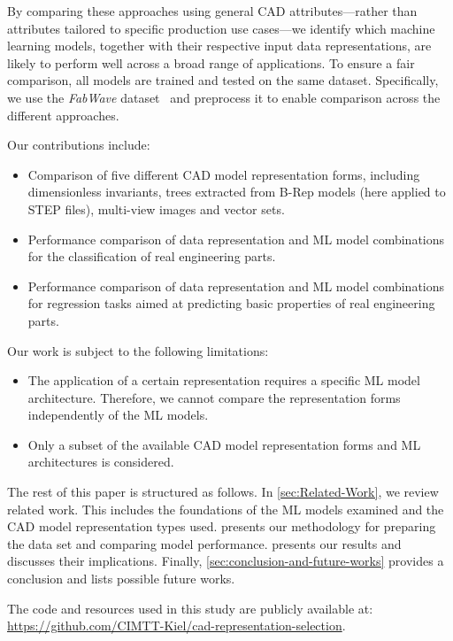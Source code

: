 \documentclass[5p,times,procedia]{elsarticle}
\begin{document}
By comparing these approaches using general CAD attributes—rather than attributes tailored to specific production use cases—we identify which machine learning models, together with their respective input data representations, are likely to perform well across a broad range of applications.
To ensure a fair comparison, all models are trained and tested on the same dataset.
Specifically, we use the \textit{FabWave} dataset~\cite{starly2019fabwave} and preprocess it to enable comparison across the different approaches.

Our contributions include: 
\begin{itemize}
    \item Comparison of five different CAD model representation forms, including dimensionless invariants, trees extracted from \mbox{B-Rep} models (here applied to STEP files), multi-view images and vector sets.
    \item Performance comparison of data representation and ML model combinations for the classification of real engineering parts.
    \item Performance comparison of data representation and ML model combinations for regression tasks aimed at predicting basic properties of real engineering parts.
\end{itemize}

Our work is subject to the following limitations:
\begin{itemize}
    \item The application of a certain representation requires a specific ML model architecture. Therefore, we cannot compare the representation forms independently of the ML models.
    \item Only a subset of the available CAD model representation forms and ML architectures is considered. 
\end{itemize}

The rest of this paper is structured as follows.
In \cref{sec:Related-Work}, we review related work. This includes the foundations of the ML models examined and the CAD model representation types used.
 presents our methodology for preparing the data set and comparing model performance.
 presents our results and discusses their implications.
Finally, \cref{sec:conclusion-and-future-works} provides a conclusion and lists possible future works. 

The code and resources used in this study are publicly available at: \url{https://github.com/CIMTT-Kiel/cad-representation-selection}.
\end{document}
